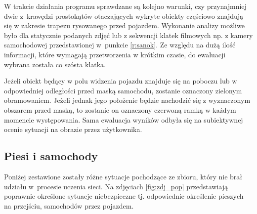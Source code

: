 \hspace{0.5cm}
 W trakcie działania programu sprawdzane są kolejno warunki, czy przynajmniej dwie z~krawędzi prostokątów otaczających wykryte obiekty częściowo znajdują się w zakresie trapezu rysowanego przed pojazdem. Wykonanie analizy możliwe było dla statycznie podanych zdjęć lub z sekwencji klatek filmowych np. z kamery samochodowej przedstawionej w~punkcie \ref{r:sanok}. Ze względu na dużą ilość informacji, które wymagają przetworzenia w krótkim czasie, do ewaluacji wybrana została co szósta klatka.
 
\hspace{0.5cm}
Jeżeli obiekt będący w polu widzenia pojazdu znajduje się na poboczu lub w odpowiedniej odległości przed maską samochodu, zostanie oznaczony zielonym obramowaniem. Jeżeli jednak jego położenie będzie nachodzić się z wyznaczonym obszarem przed maską, to zostanie on oznaczony czerwoną ramką w każdym momencie występowania. Sama ewaluacja wyników odbyła się na subiektywnej ocenie sytuacji na obrazie przez użytkownika.

\subsection{Piesi i samochody}
\hspace{0.5cm}
 Poniżej zestawione zostały różne sytuacje pochodzące ze zbioru, który nie brał udziału w~procesie uczenia sieci. Na zdjęciach \ref{fig:zdj_pop} przedstawiają poprawnie określone sytuacje niebezpieczne tj. odpowiednie określenie pieszych na przejściu, samochodów przez pojazdem. 


